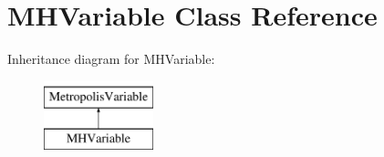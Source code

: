 \hypertarget{class_m_h_variable}{\section{M\-H\-Variable Class Reference}
\label{class_m_h_variable}
}
Inheritance diagram for M\-H\-Variable\-:\begin{figure}[H]
\begin{center}
\leavevmode
\includegraphics[height=2.000000cm]{class_m_h_variable}
\end{center}
\end{figure}
